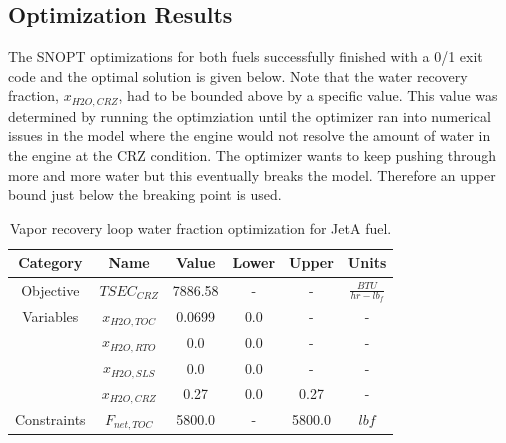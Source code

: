 \documentclass[12pt]{article}
\begin{document}
\subsection{Optimization Results}
The SNOPT optimizations for both fuels successfully finished with a 0/1 exit code and the optimal solution is given below. Note that the water recovery fraction, $x_{H2O,CRZ}$, had to be bounded above by a specific value. This value was determined by running the optimziation until the optimizer ran into numerical issues in the model where the engine would not resolve the amount of water in the engine at the CRZ condition. The optimizer wants to keep pushing through more and more water but this eventually breaks the model. Therefore an upper bound just below the breaking point is used.

\begin{table}[H]
    \centering
    \caption{Vapor recovery loop water fraction optimization for JetA fuel.}
    \begin{tabular}{|c|c|c|c|c|c|}
        \hline
        Category    & Name          & Value   & Lower & Upper  & Units                 \\
        \hline
        Objective   & $TSEC_{CRZ}$  & 7886.58 & -     & -      & $\frac{BTU}{hr-lb_f}$ \\
        \hline
        Variables   & $x_{H2O,TOC}$ & 0.0699  & 0.0   & -      & -                     \\
                    & $x_{H2O,RTO}$ & 0.0     & 0.0   & -      & -                     \\
                    & $x_{H2O,SLS}$ & 0.0     & 0.0   & -      & -                     \\
                    & $x_{H2O,CRZ}$ & 0.27    & 0.0   & 0.27   & -                     \\
        \hline
        Constraints & $F_{net,TOC}$ & 5800.0  & -     & 5800.0 & $lbf$                 \\
        \hline
    \end{tabular}
    \label{tab_jeta_opt}
\end{table}
\end{document}
